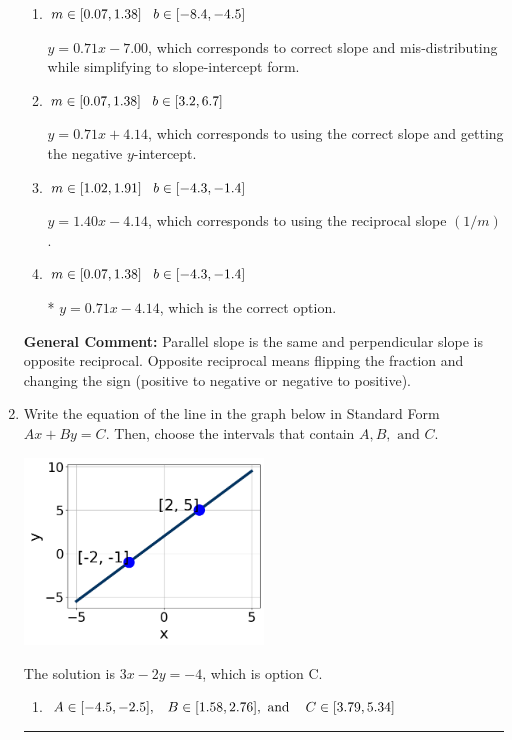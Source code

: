 \documentclass{extbook}[14pt]
\newcommand{\litem}[1]{\item #1

\rule{\textwidth}{0.4pt}}
\begin{document}
\begin{enumerate}
{\begin{enumerate}[label=\Alph*.]
 $y = -0.71x + 10.14$, which corresponds to using the negative slope.
\item \( m \in [0.07, 1.38] \hspace*{3mm} b \in [-8.4, -4.5] \)

 $y = 0.71x - 7.00$, which corresponds to correct slope and mis-distributing while simplifying to slope-intercept form.
\item \( m \in [0.07, 1.38] \hspace*{3mm} b \in [3.2, 6.7] \)

 $y = 0.71x + 4.14$, which corresponds to using the correct slope and getting the negative $y$-intercept.
\item \( m \in [1.02, 1.91] \hspace*{3mm} b \in [-4.3, -1.4] \)

 $y = 1.40x - 4.14$, which corresponds to using the reciprocal slope $(1/m)$.
\item \( m \in [0.07, 1.38] \hspace*{3mm} b \in [-4.3, -1.4] \)

* $y = 0.71x - 4.14$, which is the correct option.
\end{enumerate}

\textbf{General Comment:} Parallel slope is the same and perpendicular slope is opposite reciprocal. Opposite reciprocal means flipping the fraction and changing the sign (positive to negative or negative to positive).
}
\litem{
Write the equation of the line in the graph below in Standard Form $Ax+By=C$. Then, choose the intervals that contain $A, B, \text{ and } C$.

\begin{center}
    \includegraphics[width=0.5\textwidth]{../Figures/linearGraphToStandardCopyC.png}
\end{center}


The solution is \( 3x - 2y = -4 \), which is option C.\begin{enumerate}[label=\Alph*.]
\item \( A \in [-4.5, -2.5], \hspace{3mm} B \in [1.58, 2.76], \text{ and } \hspace{3mm} C \in [3.79, 5.34] \)


\end{enumerate}}
\end{enumerate}
\end{document}
